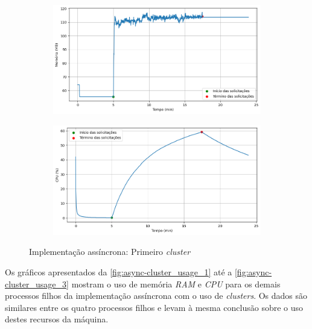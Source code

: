 \documentclass[12pt]{article}
\begin{document}
\begin{figure}[H]
	\centering
	\begin{subfigure}[H]{0.45\textwidth}
			\centering
			\label{fig:async-cluster_usage_0a}
			\includegraphics[width=1\textwidth]{images/pt-br/results/async-cluster_memory_usage_0.png}
	\end{subfigure}
	\hfill%
	\begin{subfigure}[H]{0.45\textwidth}
			\centering
			\label{fig:async-cluster_usage_0b}
			\includegraphics[width=1\textwidth]{images/pt-br/results/async-cluster_cpu_usage_0.png}
	\end{subfigure}
	
	\caption{Implementação assíncrona: Primeiro \textit{cluster}}\label{fig:async-cluster_usage_0}
\end{figure}

Os gráficos apresentados da \autoref{fig:async-cluster_usage_1} até a 
\autoref{fig:async-cluster_usage_3} mostram o uso de memória \textit{RAM}
e \textit{CPU} para os demais processos filhos da implementação assíncrona com o uso
de \textit{clusters}. Os dados são similares entre os quatro processos filhos e 
levam à mesma conclusão sobre o uso destes recursos da máquina.
\end{document}
